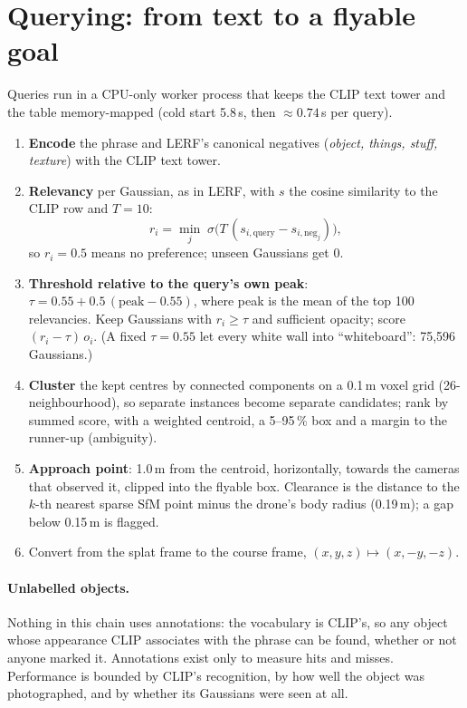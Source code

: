 \documentclass[11pt,a4paper]{article}
\begin{document}
\section{Querying: from text to a flyable goal}
Queries run in a CPU-only worker process that keeps the CLIP text tower and the table memory-mapped
(cold start 5.8\,s, then $\approx0.74$\,s per query).
\begin{enumerate}
  \item \textbf{Encode} the phrase and LERF's canonical negatives (\emph{object, things, stuff, texture}) with the
        CLIP text tower.
  \item \textbf{Relevancy} per Gaussian, as in LERF, with $s$ the cosine similarity to the CLIP row and $T=10$:
  \begin{equation}
    r_i = \min_j \; \sigma\!\bigl(T\,(s_{i,\mathrm{query}} - s_{i,\mathrm{neg}_j})\bigr),
  \end{equation}
  so $r_i=0.5$ means no preference; unseen Gaussians get 0.
  \item \textbf{Threshold relative to the query's own peak}: $\tau = 0.55 + 0.5\,(\mathrm{peak}-0.55)$, where peak is
        the mean of the top 100 relevancies. Keep Gaussians with $r_i\geq\tau$ and sufficient opacity; score
        $(r_i-\tau)\,o_i$. (A fixed $\tau=0.55$ let every white wall into ``whiteboard'': 75{,}596 Gaussians.)
  \item \textbf{Cluster} the kept centres by connected components on a 0.1\,m voxel grid (26-neighbourhood), so
        separate instances become separate candidates; rank by summed score, with a weighted centroid, a 5--95\,\%
        box and a margin to the runner-up (ambiguity).
  \item \textbf{Approach point}: 1.0\,m from the centroid, horizontally, towards the cameras that observed it,
        clipped into the flyable box. Clearance is the distance to the $k$-th nearest sparse SfM point minus the
        drone's body radius (0.19\,m); a gap below 0.15\,m is flagged.
  \item Convert from the splat frame to the course frame, $(x,y,z)\mapsto(x,-y,-z)$.
\end{enumerate}

\paragraph{Unlabelled objects.} Nothing in this chain uses annotations: the vocabulary is CLIP's, so any object
whose appearance CLIP associates with the phrase can be found, whether or not anyone marked it. Annotations exist
only to measure hits and misses. Performance is bounded by CLIP's recognition, by how well the object was
photographed, and by whether its Gaussians were seen at all.
\end{document}
